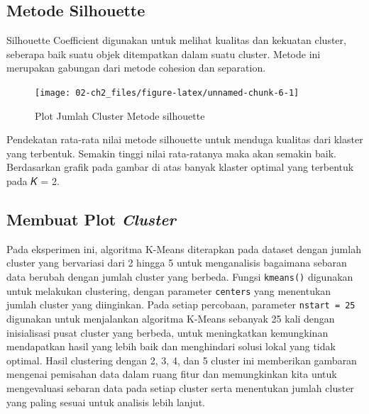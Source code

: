 \documentclass[
  oneside]{book}
\begin{document}
\subsection*{Metode Silhouette}\label{metode-silhouette}

Silhouette Coefficient digunakan untuk melihat kualitas dan kekuatan cluster, seberapa baik suatu objek ditempatkan dalam suatu cluster. Metode ini merupakan gabungan dari metode cohesion dan separation.

\begin{figure}[h]

{\centering \texttt{[image: 02-ch2\_files/figure-latex/unnamed-chunk-6-1]} 

}

\caption{Plot Jumlah Cluster Metode silhouette}\label{fig:unnamed-chunk-6}
\end{figure}

Pendekatan rata-rata nilai metode silhouette untuk menduga kualitas dari klaster yang terbentuk. Semakin tinggi nilai rata-ratanya maka akan semakin baik. Berdasarkan grafik pada gambar di atas banyak klaster optimal yang terbentuk pada 𝐾 = 2.

\subsection*{\texorpdfstring{Membuat Plot \emph{Cluster}}{Membuat Plot Cluster}}\label{membuat-plot-cluster}

Pada eksperimen ini, algoritma K-Means diterapkan pada dataset dengan jumlah cluster yang bervariasi dari 2 hingga 5 untuk menganalisis bagaimana sebaran data berubah dengan jumlah cluster yang berbeda. Fungsi \texttt{kmeans()} digunakan untuk melakukan clustering, dengan parameter \texttt{centers} yang menentukan jumlah cluster yang diinginkan. Pada setiap percobaan, parameter \texttt{nstart\ =\ 25} digunakan untuk menjalankan algoritma K-Means sebanyak 25 kali dengan inisialisasi pusat cluster yang berbeda, untuk meningkatkan kemungkinan mendapatkan hasil yang lebih baik dan menghindari solusi lokal yang tidak optimal. Hasil clustering dengan 2, 3, 4, dan 5 cluster ini memberikan gambaran mengenai pemisahan data dalam ruang fitur dan memungkinkan kita untuk mengevaluasi sebaran data pada setiap cluster serta menentukan jumlah cluster yang paling sesuai untuk analisis lebih lanjut.
\end{document}
